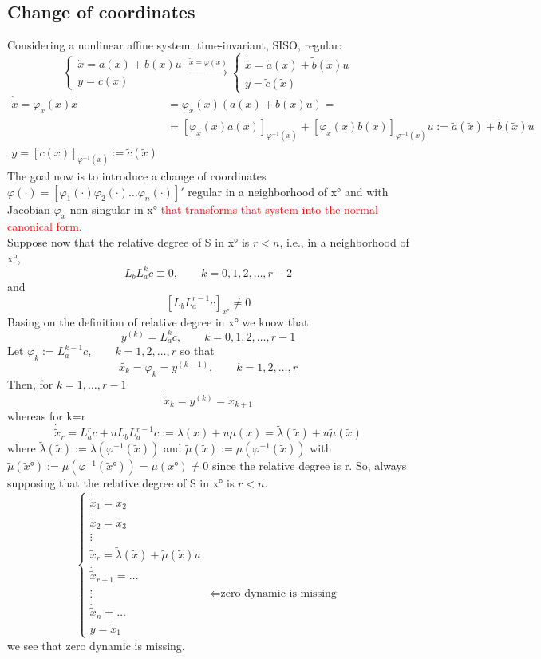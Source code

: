 \subsection{Change of coordinates}\label{changeofcoord}
Considering a nonlinear affine system, time-invariant, SISO, regular:
\[
\begin{cases}
	\dot{x}=a(x)+b(x)u\\
	y=c(x)
\end{cases} \xrightarrow{\tilde{x}=\varphi(x)}
\begin{cases}
	\dot{\tilde{x}}=\tilde{a}(\tilde{x})+\tilde{b}(\tilde{x})u\\
	y=\tilde{c}(\tilde{x})
\end{cases} 
\]
\[
\begin{aligned}
	\dot{\tilde{x}}=\varphi_x(x)\dot{x}&=\varphi_x(x)(a(x)+b(x)u)=\\
	&=[\varphi_x(x)a(x)]_{\varphi^{-1}(\tilde{x})}+[\varphi_x(x)b(x)]_{\varphi^{-1}(\tilde{x})}u :=\tilde{a}(\tilde{x})+\tilde{b}(\tilde{x})u\\
	y=[c(x)]_{\varphi^{-1}(\tilde{x})}:=\tilde{c}(\tilde{x})
\end{aligned}
\]The goal now is to introduce a change of coordinates $\varphi(\cdot)=[\varphi_1(\cdot) \varphi_2(\cdot) \dots \varphi_n(\cdot)]'$ regular in a neighborhood of x° and with Jacobian $\varphi_x$ non singular in x° \textcolor{red}{that transforms that system into the normal canonical form}.\\Suppose now that the relative degree of S in x° is $r<n$, i.e., in a neighborhood of x°, \[L_bL_a^kc\equiv 0,	\qquad k=0,1,2,\dots,r-2\] and \[[L_bL_a^{r-1}c]_{x°}\neq0\] Basing on the definition of relative degree in x° we know that \[y^{(k)}=L_a^kc,\qquad k=0,1,2,\dots,r-1\] Let $\varphi_k:=L_a^{k-1}c,\qquad k=1,2,\dots,r$ so that \[\tilde{x_k}=\varphi_k=y^{(k-1)},\qquad k=1,2,\dots,r\]Then, for $k=1,\dots,r-1$ \[\dot{\tilde{x}}_k=y^{(k)}=\tilde{x}_{k+1}\] whereas for k=r
\[
\dot{\tilde{x}}_r=L_a^rc+uL_bL_a^{r-1}c:=\lambda(x)+u\mu(x)=\tilde{\lambda}(\tilde{x})+u\tilde{\mu}(\tilde{x})
\] where $\tilde{\lambda}(\tilde{x}):=\lambda(\varphi^{-1}(\tilde{x}))$ and $\tilde{\mu}(\tilde{x}):=\mu(\varphi^{-1}(\tilde{x}))$   with $\tilde{\mu}(\tilde{x}°):=\mu(\varphi^{-1}(\tilde{x}°))=\mu(x°)\neq0$ since the relative degree is r.
So, always supposing that the relative degree of S in x° is $r<n$.
\[
\begin{cases}
		\dot{\tilde{x}}_1=\tilde{x}_2\\
		\dot{\tilde{x}}_2=\tilde{x}_3\\
		\vdots\\
		\dot{\tilde{x}}_r=\tilde{\lambda}(\tilde{x})+\tilde{\mu}(\tilde{x})u\\
		\dot{\tilde{x}}_{r+1}=\dots\\
		\vdots & \Leftarrow\text{zero dynamic is missing}\\
		\dot{\tilde{x}}_n=\dots\\
	y=\tilde{x}_1
\end{cases}
\] we  see that zero dynamic is missing.
